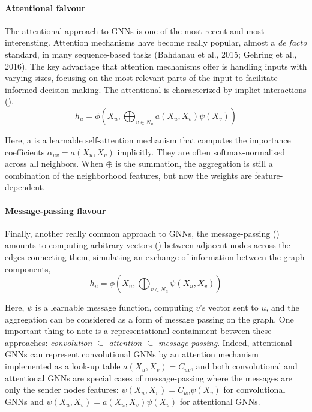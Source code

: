 \documentclass[binding=0.6cm]{sapthesis}
\begin{document}
\paragraph{Attentional falvour}
\label{sec:bg.gnn.gat}
The attentional approach to GNNs is one of the most recent and most interensting. Attention mechanisms have become really popular, almost a \textit{de facto} standard, in many sequence-based tasks (Bahdanau et al., 2015; Gehring et al., 2016). The key advantage that attention mechanisms offer is handling inputs with varying sizes, focusing on the most relevant parts of the input to facilitate informed decision-making.
The attentional  is characterized by implict interactions (\cite{veličković2018gat,monti2016-geometric-mixture,zhang2018-gaan}),
\begin{equation}
    h_u = \phi \left( X_u, \bigoplus_{v \in N_u} a(X_u,X_v) \psi(X_v) \right)
\end{equation}

Here, a is a learnable self-attention mechanism that computes the importance coefficients $\alpha_{uv} = a(X_u, X_v)$ implicitly. They are often softmax-normalised across all neighbors. When $\oplus$ is the summation, the aggregation is still a combination of the neighborhood features, but now the weights are feature-dependent.

\paragraph{Message-passing flavour}
\label{sec:bg.gnn.mp-arch}
Finally, another really common approach to GNNs, the message-passing  (\cite{gilmer2017-message-passing,battaglia2018-relational}) amounts to computing arbitrary vectors () between adjacent nodes across the edges connecting them, simulating an exchange of information between the graph components,
\begin{equation}
    h_u = \phi \left( X_u, \bigoplus_{v \in N_u} \psi(X_u,X_v) \right)
\end{equation}

Here, $\psi$ is a learnable message function, computing $v$’s vector sent to $u$, and the aggregation can be considered as a form of message passing on the graph. One important thing to note is a representational containment between these approaches: \textit{convolution} $\subseteq$ \textit{attention} $\subseteq$ \textit{message-passing}.  Indeed, attentional
GNNs can represent convolutional GNNs by an attention mechanism implemented as a look-up table $a(X_u, X_v) = C_{uv}$, and both convolutional and attentional GNNs are special cases of message-passing where the messages are only the sender nodes features: $\psi(X_u, X_v) = C_{uv}\psi(X_v)$ for convolutional GNNs and $\psi(X_u, X_v) = a(X_u, X_v)\psi(X_v)$ for attentional GNNs.
\end{document}
